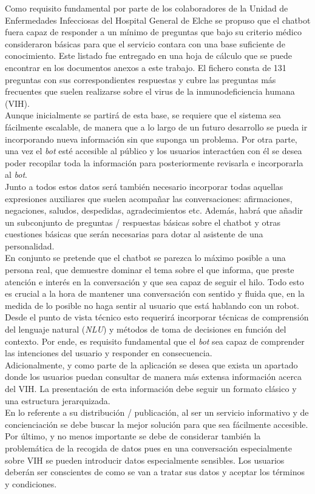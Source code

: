 Como requisito fundamental por parte de los colaboradores de la Unidad de Enfermedades Infecciosas del Hospital General de Elche se propuso que el chatbot fuera capaz de responder a un mínimo de preguntas que bajo su criterio médico consideraron básicas para que el servicio contara con una base suficiente de conocimiento. Este listado fue entregado en una hoja de cálculo que se puede encontrar en los documentos anexos a este trabajo. El fichero consta de 131 preguntas con sus correspondientes respuestas y cubre las preguntas más frecuentes que suelen realizarse sobre el virus de la inmunodeficiencia humana (VIH). \\

Aunque inicialmente se partirá de esta base, se requiere que el sistema sea fácilmente escalable, de manera que a lo largo de un futuro desarrollo se pueda ir incorporando nueva información sin que suponga un problema. Por otra parte, una vez el \textit{bot} esté accesible al público y los usuarios interactúen con él se desea poder recopilar toda la información para posteriormente revisarla e incorporarla al \textit{bot}.\\

Junto a todos estos datos será también necesario incorporar todas aquellas expresiones auxiliares que suelen acompañar las conversaciones: afirmaciones, negaciones, saludos, despedidas, agradecimientos etc. Además, habrá que añadir un subconjunto de preguntas / respuestas básicas sobre el chatbot y otras cuestiones básicas que serán necesarias para dotar al asistente de una personalidad.\\

En conjunto se pretende que el chatbot se parezca lo máximo posible a una persona real, que demuestre dominar el tema sobre el que informa, que preste atención e interés en la conversación y que sea capaz de seguir el hilo. Todo esto es crucial a la hora de mantener una conversación con sentido y fluida que, en la medida de lo posible no haga sentir al usuario que está hablando con un robot. Desde el punto de vista técnico esto requerirá incorporar técnicas de comprensión del lenguaje natural (\textit{NLU}) y métodos de toma de decisiones en función del contexto. Por ende, es requisito fundamental que el \textit{bot} sea capaz de comprender las intenciones del usuario y responder en consecuencia.\\

Adicionalmente, y como parte de la aplicación se desea que exista un apartado donde los usuarios puedan consultar de manera más extensa información acerca del VIH. La presentación de esta información debe seguir un formato clásico y una estructura jerarquizada.\\

En lo referente a su distribución / publicación, al ser un servicio informativo y de concienciación se debe buscar la mejor solución para que sea fácilmente accesible. Por último, y no menos importante se debe de considerar también la problemática de la recogida de datos pues en una conversación especialmente sobre VIH se pueden introducir datos especialmente sensibles. Los usuarios deberán ser conscientes de como se van a tratar sus datos y aceptar los términos y condiciones.\\


